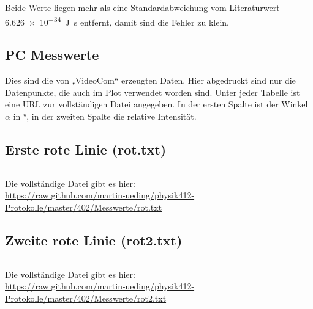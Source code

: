 Beide Werte liegen mehr als eine Standardabweichung vom Literaturwert
\SI{6.626e-34}{\joule\second} entfernt, damit sind die Fehler zu klein.


\FloatBarrier
\begin{appendix}
    \chapter{PC Messwerte}
    \label{sec:pc_messwerte}

    Dies sind die von „VideoCom“ erzeugten Daten. Hier abgedruckt sind nur die
    Datenpunkte, die auch im Plot verwendet worden sind. Unter jeder Tabelle
    ist eine URL zur vollständigen Datei angegeben. In der ersten Spalte ist
    der Winkel $\alpha$ in $\si\degree$, in der zweiten Spalte die relative
    Intensität.

    \section{Erste rote Linie (rot.txt)}
    \begin{multicols}{5}
        \inputminted[tabsize=4, firstline=<< rot_lower >>, lastline=<< rot_upper >>, fontsize=\footnotesize]{text}{../Messwerte/rot.txt}
    \end{multicols}

    Die vollständige Datei gibt es hier: \\
    \url{https://raw.github.com/martin-ueding/physik412-Protokolle/master/402/Messwerte/rot.txt}

    \section{Zweite rote Linie (rot2.txt)}
    \begin{multicols}{5}
        \inputminted[tabsize=4, firstline=<< rot2_lower >>, lastline=<< rot2_upper >>, fontsize=\footnotesize]{text}{../Messwerte/rot2.txt}
    \end{multicols}

    Die vollständige Datei gibt es hier: \\
    \url{https://raw.github.com/martin-ueding/physik412-Protokolle/master/402/Messwerte/rot2.txt}


\end{appendix}
